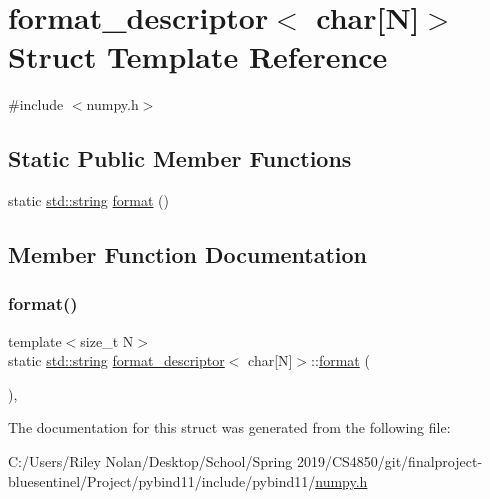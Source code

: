 \hypertarget{structformat__descriptor_3_01char[_n]_4}{}\section{format\+\_\+descriptor$<$ char\mbox{[}N\mbox{]}$>$ Struct Template Reference}
\label{structformat__descriptor_3_01char[_n]_4}


{\ttfamily \#include $<$numpy.\+h$>$}

\subsection*{Static Public Member Functions}
\begin{DoxyCompactItemize}
\item 
static \mbox{\hyperlink{_s_d_l__opengl__glext_8h_ab4ccfaa8ab0e1afaae94dc96ef52dde1}{std\+::string}} \mbox{\hyperlink{structformat__descriptor_3_01char[_n]_4_a515d2f7d101b315a139d292972ffc438}{format}} ()
\end{DoxyCompactItemize}


\subsection{Member Function Documentation}
\mbox{\label{structformat__descriptor_3_01char[_n]_4_a515d2f7d101b315a139d292972ffc438}} 
\subsubsection{\texorpdfstring{format()}{format()}}
{\footnotesize\ttfamily template$<$size\+\_\+t N$>$ \\
static \mbox{\hyperlink{_s_d_l__opengl__glext_8h_ab4ccfaa8ab0e1afaae94dc96ef52dde1}{std\+::string}} \mbox{\hyperlink{structformat__descriptor}{format\+\_\+descriptor}}$<$ char\mbox{[}N\mbox{]}$>$\+::\mbox{\hyperlink{_s_d_l__audio_8h_a71a65ffd977afe9c3fef116a5bc9ee27}{format}} (\begin{DoxyParamCaption}{ }\end{DoxyParamCaption})\hspace{0.3cm}{\ttfamily [inline]}, {\ttfamily [static]}}



The documentation for this struct was generated from the following file\+:\begin{DoxyCompactItemize}
\item 
C\+:/\+Users/\+Riley Nolan/\+Desktop/\+School/\+Spring 2019/\+C\+S4850/git/finalproject-\/bluesentinel/\+Project/pybind11/include/pybind11/\mbox{\hyperlink{numpy_8h}{numpy.\+h}}\end{DoxyCompactItemize}
